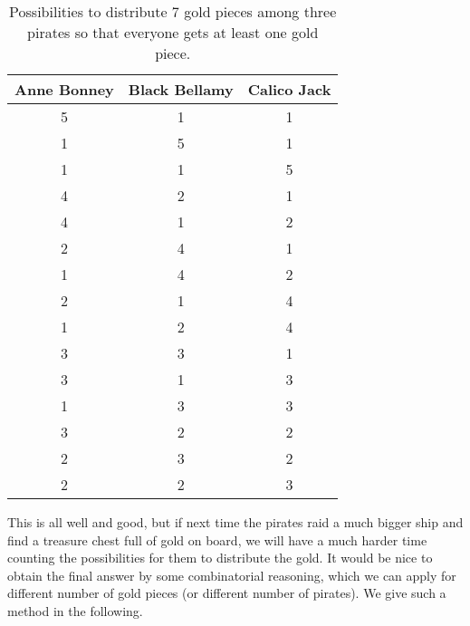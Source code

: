 \begin{table}[!htb]
\caption{Possibilities to distribute 7 gold pieces among three pirates so that everyone gets at least one gold piece.}\label{tab:7gp3p}
\begin{center}
\begin{tabular}{|c|c|c|}
\hline
Anne Bonney & Black Bellamy & Calico Jack \\
\hline
\hline
5 & 1 & 1 \\
1 & 5 & 1 \\
1 & 1 & 5 \\
4 & 2 & 1 \\
4 & 1 & 2 \\
2 & 4 & 1 \\
1 & 4 & 2 \\
2 & 1 & 4 \\
1 & 2 & 4 \\
3 & 3 & 1 \\
3 & 1 & 3 \\
1 & 3 & 3 \\
3 & 2 & 2 \\
2 & 3 & 2 \\
2 & 2 & 3 \\
\hline
\end{tabular}
\end{center}
\end{table}

This is all well and good, but if next time the pirates raid a much bigger ship and find a treasure chest full of gold on board, 
we will have a much harder time counting the possibilities for them to distribute the gold. 
It would be nice to obtain the final answer by some combinatorial reasoning, 
which we can apply for different number of gold pieces (or different number of pirates). 
We give such a method in the following. 

